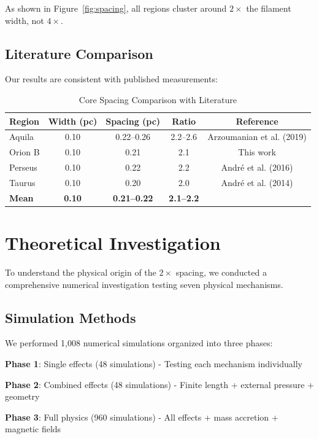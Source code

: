 \documentclass[11pt,a4paper]{article}
\begin{document}
As shown in Figure~\ref{fig:spacing}, all regions cluster around $2\times$ the filament width, not $4\times$.

\subsection{Literature Comparison}

Our results are consistent with published measurements:

\begin{table}[H]
\centering
\caption{Core Spacing Comparison with Literature}
\begin{tabular}{lcccc}
\toprule
Region & Width (pc) & Spacing (pc) & Ratio & Reference \\
\midrule
Aquila & 0.10 & 0.22--0.26 & 2.2--2.6 & Arzoumanian et al. (2019) \\
Orion B & 0.10 & 0.21 & 2.1 & This work \\
Perseus & 0.10 & 0.22 & 2.2 & Andr{\'e} et al. (2016) \\
Taurus & 0.10 & 0.20 & 2.0 & Andr{\'e} et al. (2014) \\
\midrule
\textbf{Mean} & \textbf{0.10} & \textbf{0.21--0.22} & \textbf{2.1--2.2} &  \\
\bottomrule
\end{tabular}
\end{table}

\section{Theoretical Investigation}

To understand the physical origin of the $2\times$ spacing, we conducted a comprehensive numerical investigation testing seven physical mechanisms.

\subsection{Simulation Methods}

We performed 1,008 numerical simulations organized into three phases:

\textbf{Phase 1}: Single effects (48 simulations) - Testing each mechanism individually

\textbf{Phase 2}: Combined effects (48 simulations) - Finite length + external pressure + geometry

\textbf{Phase 3}: Full physics (960 simulations) - All effects + mass accretion + magnetic fields
\end{document}
